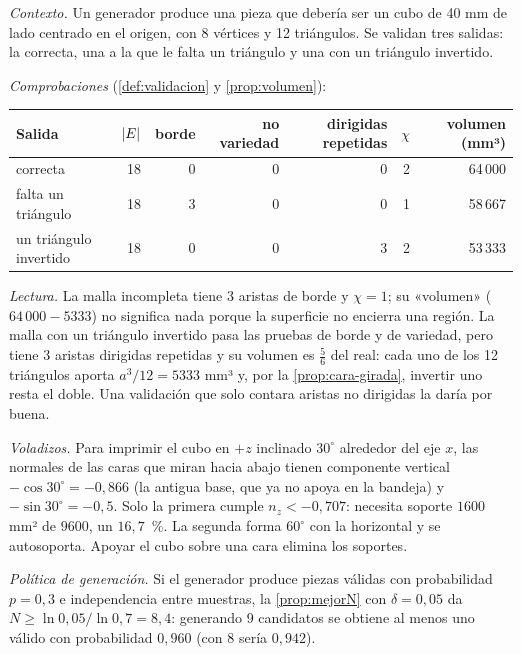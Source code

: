 \begin{ejemplo}\label{ej:validacion}
\emph{Contexto.} Un generador produce una pieza que debería ser un cubo de 40 mm de lado centrado en el origen, con 8 vértices y 12 triángulos. Se validan tres salidas: la correcta, una a la que le falta un triángulo y una con un triángulo invertido.

\emph{Comprobaciones} (\cref{def:validacion} y \cref{prop:volumen}):

\begin{center}\small
\begin{tabular}{@{}lrrrrrr@{}}
\toprule
Salida & $\lvert E\rvert$ & borde & no variedad & dirigidas repetidas & $\chi$ & volumen (mm³) \\
\midrule
correcta & 18 & 0 & 0 & 0 & 2 & 64\,000 \\
falta un triángulo & 18 & 3 & 0 & 0 & 1 & 58\,667 \\
un triángulo invertido & 18 & 0 & 0 & 3 & 2 & 53\,333 \\
\bottomrule
\end{tabular}
\end{center}

\emph{Lectura.} La malla incompleta tiene 3 aristas de borde y $\chi=1$; su «volumen» ($64\,000-5333$) no significa nada porque la superficie no encierra una región. La malla con un triángulo invertido pasa las pruebas de borde y de variedad, pero tiene 3 aristas dirigidas repetidas y su volumen es $\tfrac56$ del real: cada uno de los 12 triángulos aporta $a^3/12=5333$ mm³ y, por la \cref{prop:cara-girada}, invertir uno resta el doble. Una validación que solo contara aristas no dirigidas la daría por buena.

\emph{Voladizos.} Para imprimir el cubo en $+z$ inclinado $30^\circ$ alrededor del eje $x$, las normales de las caras que miran hacia abajo tienen componente vertical $-\cos 30^\circ=-0{,}866$ (la antigua base, que ya no apoya en la bandeja) y $-\sin 30^\circ=-0{,}5$. Solo la primera cumple $n_z<-0{,}707$: necesita soporte $1600$ mm² de $9600$, un $16{,}7$~\%. La segunda forma $60^\circ$ con la horizontal y se autosoporta. Apoyar el cubo sobre una cara elimina los soportes.

\emph{Política de generación.} Si el generador produce piezas válidas con probabilidad $p=0{,}3$ e independencia entre muestras, la \cref{prop:mejorN} con $\delta=0{,}05$ da $N\ge\ln 0{,}05/\ln 0{,}7=8{,}4$: generando 9 candidatos se obtiene al menos uno válido con probabilidad $0{,}960$ (con 8 sería $0{,}942$).
\end{ejemplo}

